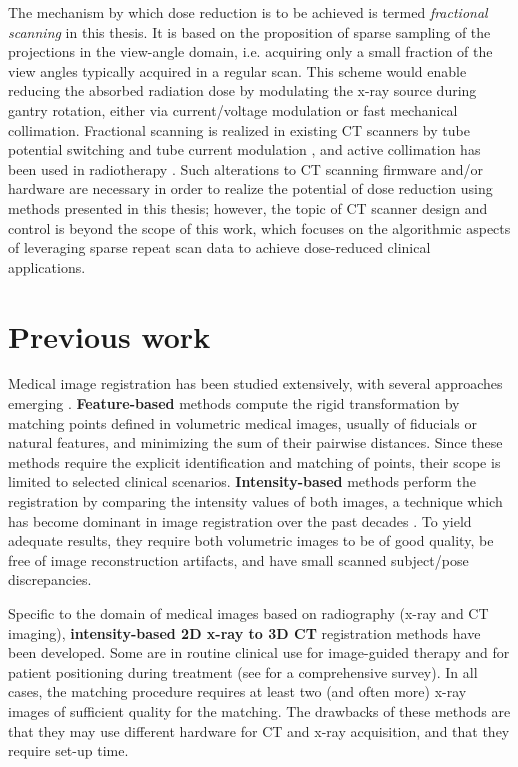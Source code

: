 The mechanism by which dose reduction is to be achieved is termed \textit{fractional scanning} in this thesis. 
It is based on the proposition of sparse sampling of the projections in the view-angle domain, i.e. acquiring only a small fraction of the view angles typically acquired in a regular scan.
This scheme would enable reducing the absorbed radiation dose by modulating the x-ray source during gantry rotation, either via current/voltage modulation or fast mechanical collimation.
Fractional scanning is realized in existing CT scanners by tube potential switching and tube current modulation \cite{kalra2004techniques}, and active collimation has been used in radiotherapy \cite{mackie2006history}.
Such alterations to CT scanning firmware and/or hardware are necessary in order to realize the potential of dose reduction using methods presented in this thesis; however, the topic of CT scanner design and control is beyond the scope of this work, which focuses on the algorithmic aspects of leveraging sparse repeat scan data to achieve dose-reduced clinical applications.

\section{Previous work}

Medical image registration has been studied extensively, with several approaches emerging \cite{maintz1998survey}.
\textbf{Feature-based} methods compute the rigid transformation by matching points defined in volumetric medical images, usually of fiducials or natural features, and minimizing the sum of their pairwise distances. Since these methods require the explicit identification and matching of points, their scope is limited to selected clinical scenarios. 
\textbf{Intensity-based} methods perform the registration by comparing the intensity values of both images, a technique which has become dominant in image registration over the past decades \cite{viergever2016survey}. To yield adequate results, they require both volumetric images to be of good quality, be free of image reconstruction artifacts, and have small scanned subject/pose discrepancies.

Specific to the domain of medical images based on radiography (x-ray and CT imaging), \textbf{intensity-based 2D x-ray to 3D CT} registration methods have been developed. Some are in routine clinical use for image-guided therapy and for patient positioning during treatment (see \cite{markelj2012review} for a comprehensive survey). In all cases, the matching procedure requires at least two (and often more) x-ray images of sufficient quality for the matching. The drawbacks of these methods are that they may use different hardware for CT and x-ray acquisition, and that they require set-up time.

